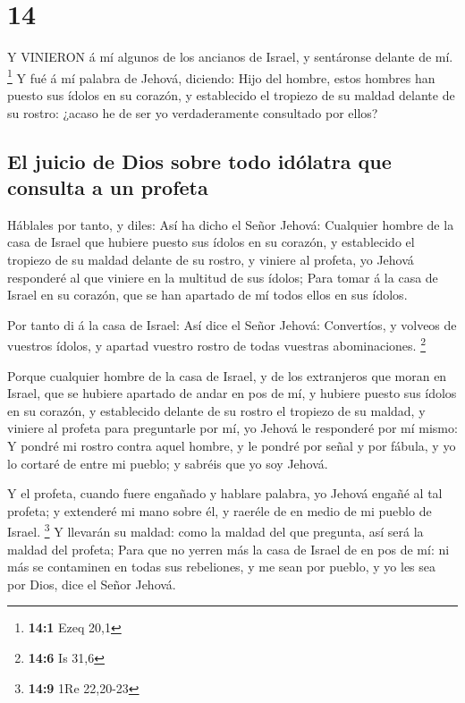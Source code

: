 \hypertarget{section-13}{%
\section{14}\label{section-13}}

 Y VINIERON á mí algunos de los ancianos de Israel, y
sentáronse delante de mí. \footnote{\textbf{14:1} Ezeq 20,1}
 Y fué á mí palabra de Jehová, diciendo:  Hijo
del hombre, estos hombres han puesto sus ídolos en su corazón, y
establecido el tropiezo de su maldad delante de su rostro: ¿acaso he de
ser yo verdaderamente consultado por ellos?

\hypertarget{el-juicio-de-dios-sobre-todo-iduxf3latra-que-consulta-a-un-profeta}{%
\subsection{El juicio de Dios sobre todo idólatra que consulta a un
profeta}\label{el-juicio-de-dios-sobre-todo-iduxf3latra-que-consulta-a-un-profeta}}

 Háblales por tanto, y diles: Así ha dicho el Señor Jehová:
Cualquier hombre de la casa de Israel que hubiere puesto sus ídolos en
su corazón, y establecido el tropiezo de su maldad delante de su rostro,
y viniere al profeta, yo Jehová responderé al que viniere en la multitud
de sus ídolos;  Para tomar á la casa de Israel en su
corazón, que se han apartado de mí todos ellos en sus ídolos.

 Por tanto di á la casa de Israel: Así dice el Señor Jehová:
Convertíos, y volveos de vuestros ídolos, y apartad vuestro rostro de
todas vuestras abominaciones. \footnote{\textbf{14:6} Is 31,6}

 Porque cualquier hombre de la casa de Israel, y de los
extranjeros que moran en Israel, que se hubiere apartado de andar en pos
de mí, y hubiere puesto sus ídolos en su corazón, y establecido delante
de su rostro el tropiezo de su maldad, y viniere al profeta para
preguntarle por mí, yo Jehová le responderé por mí mismo:  Y
pondré mi rostro contra aquel hombre, y le pondré por señal y por
fábula, y yo lo cortaré de entre mi pueblo; y sabréis que yo soy Jehová.

 Y el profeta, cuando fuere engañado y hablare palabra, yo
Jehová engañé al tal profeta; y extenderé mi mano sobre él, y raeréle de
en medio de mi pueblo de Israel. \footnote{\textbf{14:9} 1Re 22,20-23}
 Y llevarán su maldad: como la maldad del que pregunta, así
será la maldad del profeta;  Para que no yerren más la casa
de Israel de en pos de mí: ni más se contaminen en todas sus rebeliones,
y me sean por pueblo, y yo les sea por Dios, dice el Señor Jehová.

